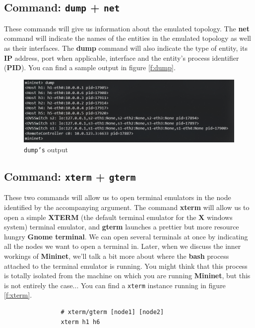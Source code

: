 \documentclass[12pt]{report}
\begin{document}
		\subsection{Command: \texttt{dump} + \texttt{net}}
			These commands will give us information about the emulated topology. The \textbf{net} command will indicate the names of the entities in the emulated topology as well as their interfaces. The \textbf{dump} command will also indicate the type of entity, its \textbf{IP} address, port when applicable, interface and the entity's process identifier (\textbf{PID}). You can find a sample output in figure \ref{f:dump}.

			\begin{figure}
				\centering
				\includegraphics[scale = 1]{dump.png}
				\caption{\texttt{dump's} output}
				\label{f:fump}
			\end{figure}

		\subsection{Command: \texttt{xterm} + \texttt{gterm}}
			These two commands will allow us to open terminal emulators in the node identified by the accompanying argument. The command \textbf{xterm} will allow us to open a simple \textbf{XTERM} (the default terminal emulator for the \textbf{X} windows system) terminal emulator, and \textbf{gterm} launches a prettier but more resource hungry \textbf{Gnome terminal}. We can open several terminals at once by indicating all the nodes we want to open a terminal in. Later, when we discuss the inner workings of \textbf{Mininet}, we'll talk a bit more about where the \textbf{bash} process attached to the terminal emulator is running. You might think that this process is totally isolated from the machine on which you are running \textbf{Mininet}, but this is not entirely the case... You can find a \texttt{xterm} instance running in figure \ref{f:xterm}.

			\begin{verbatim}
				# xterm/gterm [node1] [node2]
				xterm h1 h6
			\end{verbatim}
\end{document}
